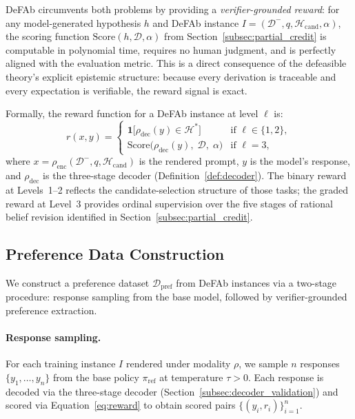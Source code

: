 \documentclass{article}
\theoremstyle{definition}
\newcommand{\D}{\mathcal{D}}
\newcommand{\Dm}{\mathcal{D}^{-}}
\newcommand{\Hcand}{\mathcal{H}_{\mathrm{cand}}}
\newcommand{\Hgold}{\mathcal{H}^{*}}
\begin{document}
DeFAb circumvents both problems by providing a \emph{verifier-grounded reward}: for any model-generated hypothesis $h$ and DeFAb instance $I = (\Dm, q, \Hcand, \alpha)$, the scoring function $\mathrm{Score}(h, \D, \alpha)$ from Section~\ref{subsec:partial_credit} is computable in polynomial time, requires no human judgment, and is perfectly aligned with the evaluation metric. This is a direct consequence of the defeasible theory's explicit epistemic structure: because every derivation is traceable and every expectation is verifiable, the reward signal is exact.

Formally, the reward function for a DeFAb instance at level $\ell$ is:
\begin{equation}\label{eq:reward}
    r(x, y) = \begin{cases}
        \mathbf{1}\bigl[\rho_{\mathrm{dec}}(y) \in \Hgold\bigr] & \text{if } \ell \in \{1, 2\}, \\[4pt]
        \mathrm{Score}\bigl(\rho_{\mathrm{dec}}(y),\; \D,\; \alpha\bigr) & \text{if } \ell = 3,
    \end{cases}
\end{equation}
where $x = \rho_{\mathrm{enc}}(\Dm, q, \Hcand)$ is the rendered prompt, $y$ is the model's response, and $\rho_{\mathrm{dec}}$ is the three-stage decoder (Definition~\ref{def:decoder}). The binary reward at Levels~1--2 reflects the candidate-selection structure of those tasks; the graded reward at Level~3 provides ordinal supervision over the five stages of rational belief revision identified in Section~\ref{subsec:partial_credit}.


\subsection{Preference Data Construction}\label{subsec:pref_data}

We construct a preference dataset $\mathcal{D}_{\mathrm{pref}}$ from DeFAb instances via a two-stage procedure: response sampling from the base model, followed by verifier-grounded preference extraction.

\paragraph{Response sampling.} For each training instance $I$ rendered under modality $\rho$, we sample $n$ responses $\{y_1, \ldots, y_n\}$ from the base policy $\pi_{\mathrm{ref}}$ at temperature $\tau > 0$. Each response is decoded via the three-stage decoder (Section~\ref{subsec:decoder_validation}) and scored via Equation~\ref{eq:reward} to obtain scored pairs $\{(y_i, r_i)\}_{i=1}^n$.
\end{document}
